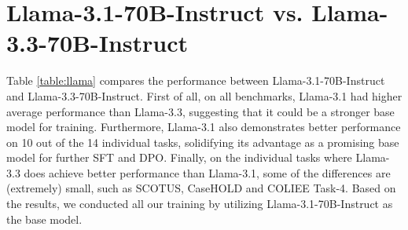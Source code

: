 \section{Llama-3.1-70B-Instruct vs. Llama-3.3-70B-Instruct}
\label{section:llama}

Table \ref{table:llama} compares the performance between Llama-3.1-70B-Instruct and Llama-3.3-70B-Instruct. First of all, on all benchmarks, Llama-3.1 had higher average performance than Llama-3.3, suggesting that it could be a stronger base model for training. Furthermore, Llama-3.1 also demonstrates better performance on 10 out of the 14 individual tasks, solidifying its advantage as a promising base model for further SFT and DPO. Finally, on the individual tasks where Llama-3.3 does achieve better performance than Llama-3.1, some of the differences are (extremely) small, such as SCOTUS, CaseHOLD and COLIEE Task-4. Based on the results, we conducted all our training by utilizing Llama-3.1-70B-Instruct as the base model.
